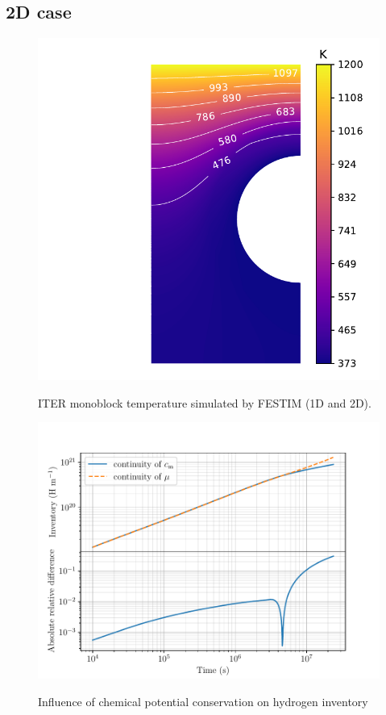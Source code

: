 \subsection{2D case}
\begin{figure}
    \centering
    \includegraphics[width=\linewidth]{Figures/Chapter3/monoblocks/interface_condition/iter case/temperature_field_2d.pdf}
    \label{fig: 2D temperature}
    \caption{ITER monoblock temperature simulated by FESTIM (1D and 2D).}
\end{figure}

\begin{figure}
    \centering
    \includegraphics[width=\linewidth]{Figures/Chapter3/monoblocks/interface_condition/iter case/comparison_inventory_2d.pdf}
    \label{fig: 2D inventories}
    \caption{Influence of chemical potential conservation on hydrogen inventory}
\end{figure}

